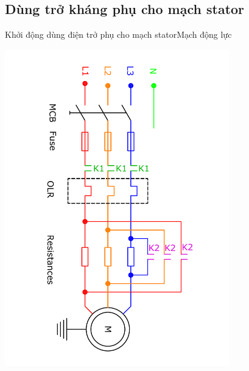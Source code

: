 \documentclass[17pt]{beamer}
\begin{document}
\subsection*{Dùng trở kháng phụ cho mạch stator}
\begin{frame}{Khởi động dùng điện trở phụ cho mạch stator}{Mạch động lực}
\vspace{-2.5cm}
\begin{center}
\includegraphics[width = 0.73\textwidth,angle=90]{../sodomach/sodomach-bc-chude1-4.pdf}
\end{center}
\end{frame}
\end{document}

